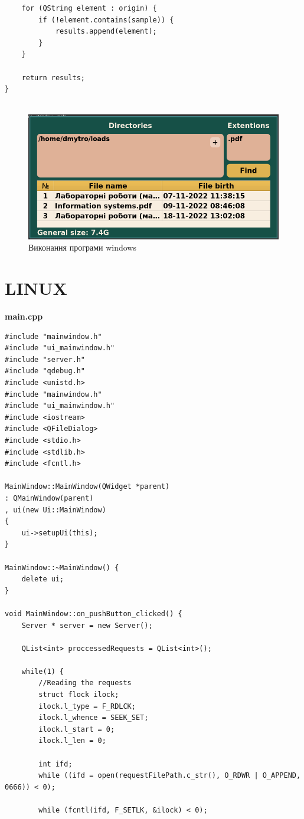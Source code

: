 \documentclass{article}
\begin{document}
\begin{normalsize}
\begin{lstlisting}
	for (QString element : origin) {
		if (!element.contains(sample)) {
			results.append(element);
		}
	}
	
	return results;
}


	\end{lstlisting}
	
	\begin{figure}[H]
		\centering
		\includegraphics[scale=0.6]{1}
		\caption{Виконання програми windows}
	\end{figure}

\section*{LINUX}
\textbf{main.cpp}
\begin{lstlisting}
#include "mainwindow.h"
#include "ui_mainwindow.h"
#include "server.h"
#include "qdebug.h"
#include <unistd.h>
#include "mainwindow.h"
#include "ui_mainwindow.h"
#include <iostream>
#include <QFileDialog>
#include <stdio.h>
#include <stdlib.h>
#include <fcntl.h>

MainWindow::MainWindow(QWidget *parent)
: QMainWindow(parent)
, ui(new Ui::MainWindow)
{
	ui->setupUi(this);
}

MainWindow::~MainWindow() {
	delete ui;
}

void MainWindow::on_pushButton_clicked() {
	Server * server = new Server();
	
	QList<int> proccessedRequests = QList<int>();
	
	while(1) {
		//Reading the requests
		struct flock ilock;
		ilock.l_type = F_RDLCK;
		ilock.l_whence = SEEK_SET;
		ilock.l_start = 0;
		ilock.l_len = 0;
		
		int ifd;
		while ((ifd = open(requestFilePath.c_str(), O_RDWR | O_APPEND, 0666)) < 0);
		
		while (fcntl(ifd, F_SETLK, &ilock) < 0);
		

\end{lstlisting}
\end{normalsize}
\end{document}
